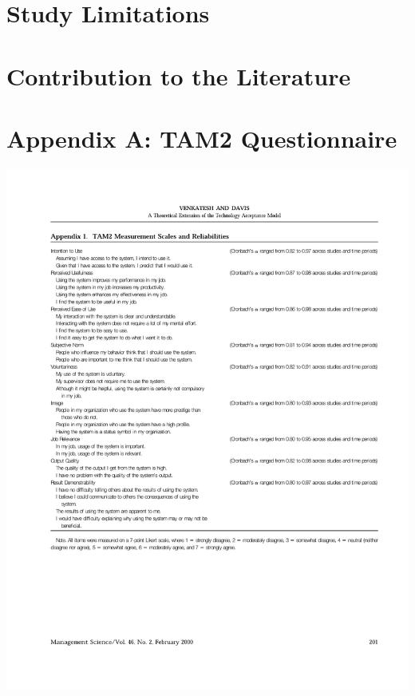 \documentclass[12pt]{memoir}
\begin{document}
\clearpage
\chapter{Study Limitations}


\chapter{Contribution to the Literature}


%

\printglossary

\newpage



\appendix

\clearpage
\chapter{Appendix A: TAM2 Questionnaire}
\includegraphics[trim={25mm 60mm 10mm 0mm}]{pdf/TAM2.pdf}
\end{document}
